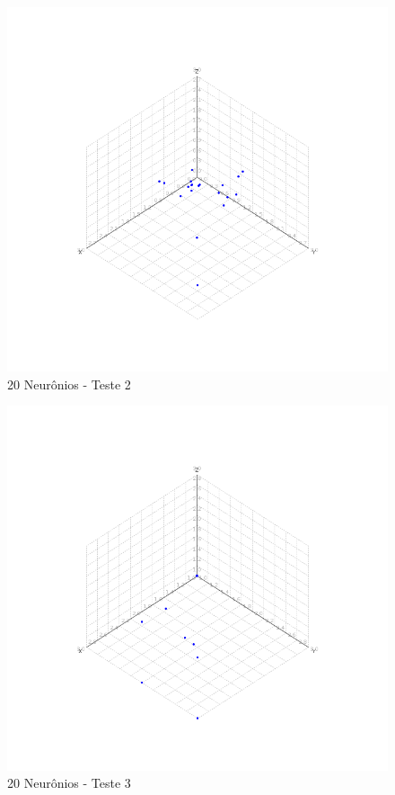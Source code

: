 \begin{figure}[ht!]
	\centering
	\includegraphics[scale=0.4]{./imgs/fig:out_20_teste_2}
	\caption{20 Neurônios - Teste 2}
	\label{fig:out_20_teste_2}
\end{figure}

\begin{figure}[ht!]
	\centering
	\includegraphics[scale=0.4]{./imgs/fig:out_20_teste_3}
	\caption{20 Neurônios - Teste 3}
	\label{fig:out_20_teste_3}
\end{figure}

